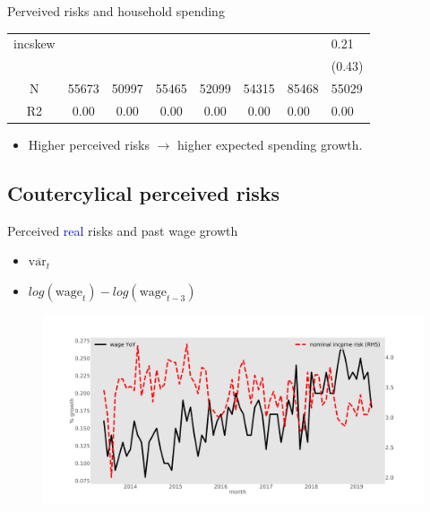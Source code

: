 \documentclass{beamer}
\begin{document}
\begin{frame}{Perveived risks and household spending}
\begin{table}
{\begin{tabular}{ccccccll}
		incskew   &            &             &              &               &                &                 &             0.21 \\
		&            &             &              &               &                &                 &           (0.43) \\
		\hline 
		N         &      55673 &       50997 &        55465 &         52099 &          54315 &           85468 &            55029 \\
		R2        &       0.00 &        0.00 &         0.00 &          0.00 &           0.00 &            0.00 &             0.00 \\
		\hline 
	\end{tabular}
		}
	\end{table}
\begin{itemize}
	\item  Higher perceived risks $\rightarrow$ higher expected spending growth. 
\end{itemize}
\end{frame}


\subsection{Coutercylical perceived risks}


\begin{frame}{Perceived \textcolor{blue}{real} risks and past wage growth}
	\begin{itemize}
		\item $\overline{\text{var}_{t}} $
\item  $log(\text{wage}_t) - log(\text{wage}_{t-3})$
\end{itemize}
	\begin{figure}
		\centering
		\label{ts_var}
		\includegraphics[width=\textwidth]{figures/tsMeanvar_he.jpg}
	\end{figure}
\end{frame}
\end{document}
